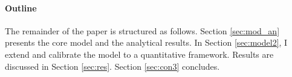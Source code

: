 	\paragraph{Outline}
The remainder of the paper is structured as follows. Section \ref{sec:mod_an} presents the core model and the analytical results. In Section \ref{sec:model2}, I extend and calibrate the model to a quantitative framework.  Results are discussed in Section \ref{sec:res}. Section \ref{sec:con3} concludes.